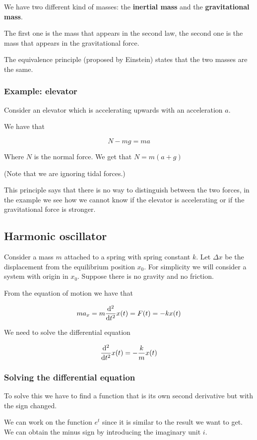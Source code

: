 \documentclass[14pt]{extarticle}
\begin{document}
We have two different kind of masses: the \textbf{inertial mass} and the \textbf{gravitational mass}.

The first one is the mass that appears in the second law, the second one is the mass that appears in the gravitational force.

The equivalence principle (proposed by Einstein) states that the two masses are the same.

\subsubsection{Example: elevator}

Consider an elevator which is accelerating upwards with an acceleration $a$.

We have that

$$
  N - m g = m a
$$

Where $N$ is the normal force. We get that $N = m(a + g)$

(Note that we are ignoring tidal forces.)

This principle says that there is no way to distinguish between the two forces, in the example we see how we cannot know if the elevator is accelerating or if the gravitational force is stronger.

\subsection{Harmonic oscillator}

Consider a mass $m$ attached to a spring with spring constant $k$. Let $\Delta x$ be the displacement from the equilibrium position $x_0$. For simplicity we will consider a system with origin in $x_0$. Suppose there is no gravity and no friction.

From the equation of motion we have that

$$
  m a_x = m \dv[2]{t}x(t) = F(t) = - k x(t)
$$

We need to solve the differential equation

$$
  \dv[2]{t}x(t) = - \frac{k}{m} x(t)
$$

\subsubsection{Solving the differential equation}

To solve this we have to find a function that is its own second derivative but with the sign changed.

We can work on the function $e^t$ since it is similar to the result we want to get. We can obtain the minus sign by introducing the imaginary unit $i$.
\end{document}
